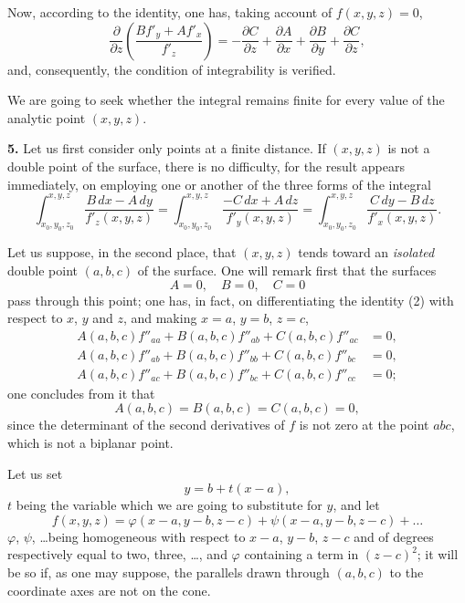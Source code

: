 \documentclass{article}
\begin{document}
Now, according to the identity, one has, taking account of $f(x, y, z) = 0$,
\[
\frac{\partial}{\partial z} \left( \frac{B f'_{y} + A f'_{x}}{f'_{z}} \right) = - \frac{\partial C}{\partial z} + \frac{\partial A}{\partial x} + \frac{\partial B}{\partial y} + \frac{\partial C}{\partial z},
\]
and, consequently, the condition of integrability is verified.

We are going to seek whether the integral remains finite for every value of the analytic point $(x, y, z)$.


\textbf{5.} Let us first consider only points at a finite distance. If $(x, y, z)$ is not a double point of the surface, there is no difficulty, for the result appears immediately, on employing one or another of the three forms of the integral
\[
\int_{x_{0}, y_{0}, z_{0}}^{x, y, z} \frac{B\,dx - A\,dy}{f'_{z}(x, y, z)} = \int_{x_{0}, y_{0}, z_{0}}^{x, y, z} \frac{- C\,dx + A\,dz}{f'_{y}(x, y, z)} = \int_{x_{0}, y_{0}, z_{0}}^{x, y, z} \frac{C\,dy - B\,dz}{f'_{x}(x, y, z)}.
\]

Let us suppose, in the second place, that $(x, y, z)$ tends toward an \emph{isolated} double point $(a, b, c)$ of the surface. One will remark first that the surfaces
\[
A = 0, \quad B = 0, \quad C = 0
\]
pass through this point; one has, in fact, on differentiating the identity (2) with respect to $x$, $y$ and $z$, and making $x = a$, $y = b$, $z = c$,
\[
\begin{aligned}
A(a, b, c) f''_{aa} + B(a, b, c) f''_{ab} + C(a, b, c) f''_{ac} &= 0, \\
A(a, b, c) f''_{ab} + B(a, b, c) f''_{bb} + C(a, b, c) f''_{bc} &= 0, \\
A(a, b, c) f''_{ac} + B(a, b, c) f''_{bc} + C(a, b, c) f''_{cc} &= 0;
\end{aligned}
\]
one concludes from it that
\[
A(a, b, c) = B(a, b, c) = C(a, b, c) = 0,
\]
since the determinant of the second derivatives of $f$ is not zero at the point $abc$, which is not a biplanar point.

Let us set
\[
y = b + t(x - a),
\]
$t$ being the variable which we are going to substitute for $y$, and let
\[
f(x, y, z) = \varphi(x - a, y - b, z - c) + \psi(x - a, y - b, z - c) + \ldots
\]
$\varphi$, $\psi$, \ldots being homogeneous with respect to $x - a$, $y - b$, $z - c$ and of degrees respectively equal to two, three, \ldots, and $\varphi$ containing a term in $(z - c)^{2}$; it will be so if, as one may suppose, the parallels drawn through $(a, b, c)$ to the coordinate axes are not on the cone.
\end{document}
